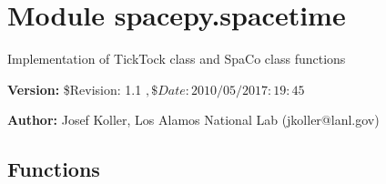 %
%
%


\section{Module spacepy.spacetime}

    \label{spacepy:spacetime}
Implementation of TickTock class and SpaCo class functions

\textbf{Version:} \$Revision: 1.1 $, \$Date: 2010/05/20 17:19:45 $



\textbf{Author:} Josef Koller, Los Alamos National Lab (jkoller@lanl.gov)





  \subsection{Functions}

    \label{spacepy:spacetime:doy2date}

    \vspace{0.5ex}


